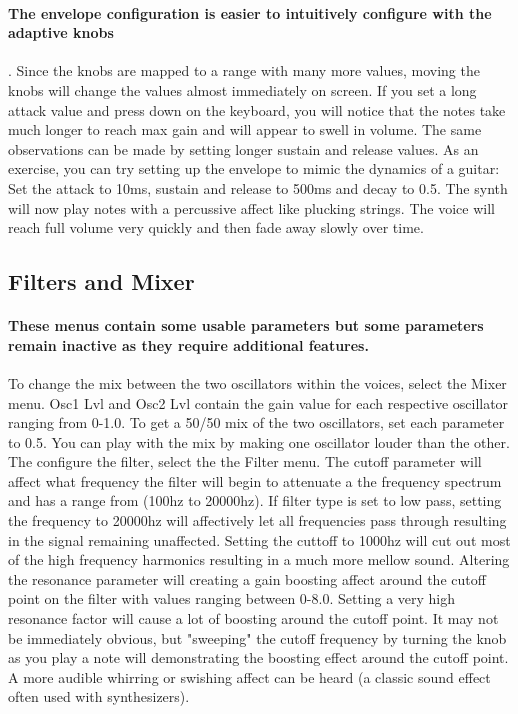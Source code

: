 \documentclass[acmlarge,screen]{acmart}
\begin{document}
\paragraph{The envelope configuration is easier to intuitively configure with the adaptive knobs}. Since the knobs are mapped to a range with many more values, moving the knobs will change the values almost immediately on screen. If you set a long attack value and press down on the keyboard, you will notice that the notes take much longer to reach max gain and will appear to swell in volume. The same observations can be made by setting longer sustain and release values. As an exercise, you can try setting up the envelope to mimic the dynamics of a guitar: Set the attack to 10ms, sustain and release to 500ms and decay to 0.5. The synth will now play notes with a percussive affect like plucking strings. The voice will reach full volume very quickly and then fade away slowly over time.

\subsection{Filters and Mixer} 
\paragraph{These menus contain some usable parameters but some parameters remain inactive as they require additional features.} To change the mix between the two oscillators within the voices, select the Mixer menu. Osc1 Lvl and Osc2 Lvl contain the gain value for each respective oscillator ranging from 0-1.0. To get a 50/50 mix of the two oscillators, set each parameter to 0.5. You can play with the mix by making one oscillator louder than the other. The configure the filter, select the the Filter menu. The cutoff parameter will affect what frequency the filter will begin to attenuate a the frequency spectrum and has a range from (100hz to 20000hz). If filter type is set to low pass, setting the frequency to 20000hz will affectively let all frequencies pass through resulting in the signal remaining unaffected. Setting the cuttoff to 1000hz will cut out most of the high frequency harmonics resulting in a much more mellow sound. Altering the resonance parameter will creating a gain boosting affect around the cutoff point on the filter with values ranging between 0-8.0. Setting a very high resonance factor will cause a lot of boosting around the cutoff point. It may not be immediately obvious, but "sweeping" the cutoff frequency by turning the knob as you play a note will demonstrating the boosting effect around the cutoff point. A more audible whirring or swishing affect can be heard (a classic sound effect often used with synthesizers).
\end{document}

